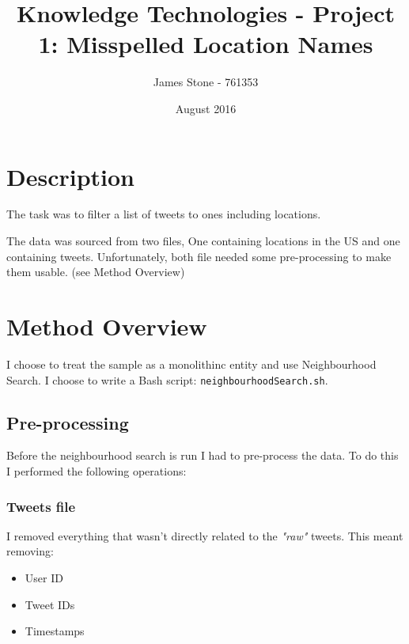 \documentclass[a4paper]{article}
\title{Knowledge Technologies - Project 1: Misspelled Location Names}
\author{James Stone - 761353}
\date{August 2016}
\begin{document}
\maketitle

\section{Description}
The task was to filter a list of tweets to ones including locations.

The data was sourced from two files, One containing locations in the US and one containing tweets.
Unfortunately, both file needed some pre-processing to make them usable. (see Method Overview)
\section{Method Overview}

I choose to treat the sample as a monolithinc entity and use Neighbourhood Search.
I choose to write a Bash script: \texttt{neighbourhoodSearch.sh}.

\subsection{Pre-processing}
Before the neighbourhood search is run I had to pre-process the data. To do this I performed the following operations:

\subsubsection{Tweets file}
I removed everything that wasn't directly related to the \textit{"raw"} tweets. This meant removing:
\begin{itemize}
  \item User ID
  \item Tweet IDs
  \item Timestamps
\end{itemize}
\end{document}
